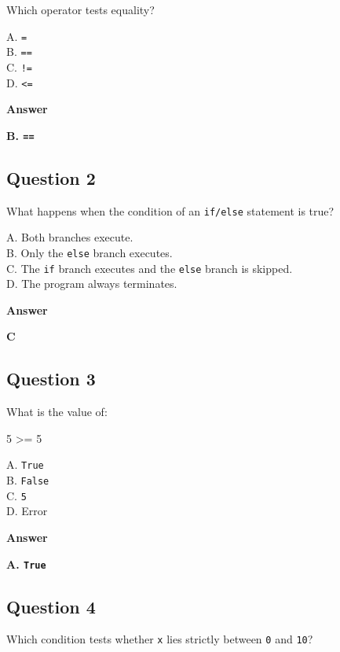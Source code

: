 \documentclass[
  11pt,
  a4paper,
]{article}
\newenvironment{Shaded}{}{}
\newcommand{\DecValTok}[1]{\textcolor[rgb]{0.25,0.63,0.44}{#1}}
\newcommand{\OperatorTok}[1]{\textcolor[rgb]{0.40,0.40,0.40}{#1}}
\begin{document}
Which operator tests equality?

A. \texttt{=}\\
B. \texttt{==}\\
C. \texttt{!=}\\
D. \texttt{\textless{}=}

\textbf{Answer}

\textbf{B. \texttt{==}}

\subsection{Question 2}\label{question-2-8}

What happens when the condition of an \texttt{if/else} statement is
true?

A. Both branches execute.\\
B. Only the \texttt{else} branch executes.\\
C. The \texttt{if} branch executes and the \texttt{else} branch is
skipped.\\
D. The program always terminates.

\textbf{Answer}

\textbf{C}

\subsection{Question 3}\label{question-3-5}

What is the value of:

\begin{Shaded}
\begin{Highlighting}[]
\DecValTok{5} \OperatorTok{\textgreater{}=} \DecValTok{5}
\end{Highlighting}
\end{Shaded}

A. \texttt{True}\\
B. \texttt{False}\\
C. \texttt{5}\\
D. Error

\textbf{Answer}

\textbf{A. \texttt{True}}

\subsection{Question 4}\label{question-4-3}

Which condition tests whether \texttt{x} lies strictly between
\texttt{0} and \texttt{10}?
\end{document}
